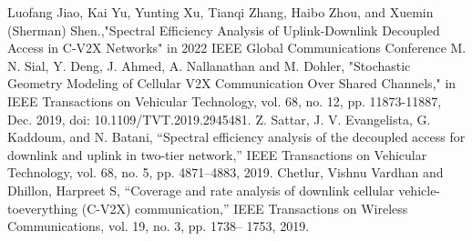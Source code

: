 \documentclass[conference]{IEEEtran}
\begin{document}
\begin{CJK*}{UTF8}{bsmi}
\begin{thebibliography}{00}
 Luofang Jiao, Kai Yu, Yunting Xu, Tianqi Zhang, Haibo Zhou, and Xuemin (Sherman) Shen.,"Spectral Efficiency Analysis of Uplink-Downlink
Decoupled Access in C-V2X Networks" in 2022 IEEE Global Communications Conference
 M. N. Sial, Y. Deng, J. Ahmed, A. Nallanathan and M. Dohler, "Stochastic Geometry Modeling of Cellular V2X Communication Over Shared Channels," in IEEE Transactions on Vehicular Technology, vol. 68, no. 12, pp. 11873-11887, Dec. 2019, doi: 10.1109/TVT.2019.2945481.
 Z. Sattar, J. V. Evangelista, G. Kaddoum, and N. Batani,
“Spectral efficiency analysis of the decoupled access
for downlink and uplink in two-tier network,” IEEE
Transactions on Vehicular Technology, vol. 68, no. 5, pp.
4871–4883, 2019.
 Chetlur, Vishnu Vardhan and Dhillon, Harpreet S, “Coverage
and rate analysis of downlink cellular vehicle-toeverything
(C-V2X) communication,” IEEE Transactions
on Wireless Communications, vol. 19, no. 3, pp. 1738–
1753, 2019.
\end{thebibliography}

\vspace{12pt}

\end{CJK*}
\end{document}
